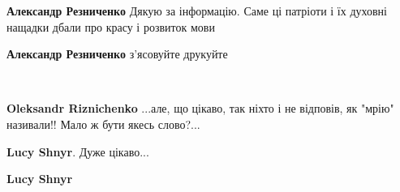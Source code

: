 \begin{itemize}
\begin{itemize}
 
\textbf{Александр Резниченко} Дякую за інформацію. Саме ці патріоти і їх духовні нащадки дбали про красу і розвиток мови

 
\textbf{Александр Резниченко} з'ясовуйте друкуйте

 
👏

 
\textbf{Oleksandr Riznichenko} ...але, що цікаво, так ніхто і не відповів, як "мрію" називали!! Мало ж бути якесь слово?...

 
\textbf{Lucy Shnyr}. Дуже цікаво...

 
\textbf{Lucy Shnyr} 🤔🤔🤔🤔

 

\end{itemize}
\end{itemize}
